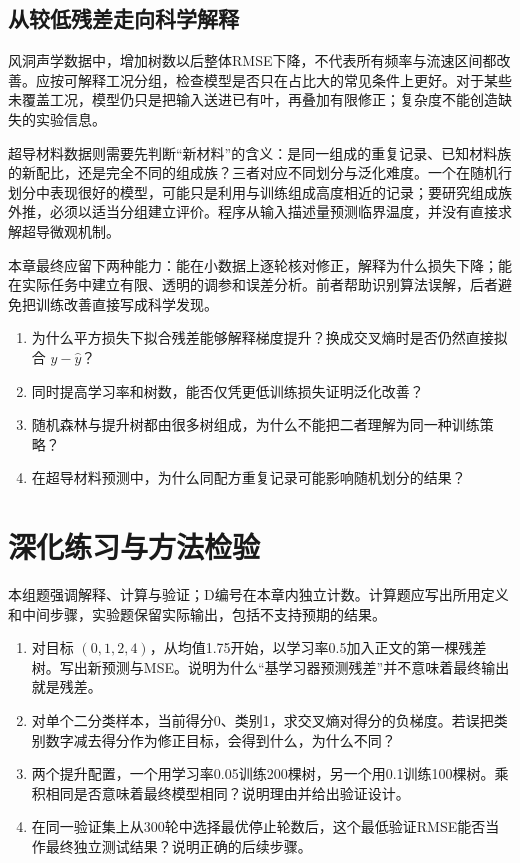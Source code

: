 \subsection{从较低残差走向科学解释}
风洞声学数据中，增加树数以后整体RMSE下降，不代表所有频率与流速区间都改善。应按可解释工况分组，检查模型是否只在占比大的常见条件上更好。对于某些未覆盖工况，模型仍只是把输入送进已有叶，再叠加有限修正；复杂度不能创造缺失的实验信息。

超导材料数据则需要先判断“新材料”的含义：是同一组成的重复记录、已知材料族的新配比，还是完全不同的组成族？三者对应不同划分与泛化难度。一个在随机行划分中表现很好的模型，可能只是利用与训练组成高度相近的记录；要研究组成族外推，必须以适当分组建立评价。程序从输入描述量预测临界温度，并没有直接求解超导微观机制。

本章最终应留下两种能力：能在小数据上逐轮核对修正，解释为什么损失下降；能在实际任务中建立有限、透明的调参和误差分析。前者帮助识别算法误解，后者避免把训练改善直接写成科学发现。

\chapterexercise
\begin{enumerate}
\item 为什么平方损失下拟合残差能够解释梯度提升？换成交叉熵时是否仍然直接拟合 $y-\hat y$？
\item 同时提高学习率和树数，能否仅凭更低训练损失证明泛化改善？
\item 随机森林与提升树都由很多树组成，为什么不能把二者理解为同一种训练策略？
\item 在超导材料预测中，为什么同配方重复记录可能影响随机划分的结果？
\end{enumerate}

\section*{深化练习与方法检验}
本组题强调解释、计算与验证；D编号在本章内独立计数。计算题应写出所用定义和中间步骤，实验题保留实际输出，包括不支持预期的结果。
\begin{enumerate}[label=D\arabic*.]
\item 对目标 $(0,1,2,4)$，从均值1.75开始，以学习率0.5加入正文的第一棵残差树。写出新预测与MSE。说明为什么“基学习器预测残差”并不意味着最终输出就是残差。
\item 对单个二分类样本，当前得分0、类别1，求交叉熵对得分的负梯度。若误把类别数字减去得分作为修正目标，会得到什么，为什么不同？
\item 两个提升配置，一个用学习率0.05训练200棵树，另一个用0.1训练100棵树。乘积相同是否意味着最终模型相同？说明理由并给出验证设计。
\item 在同一验证集上从300轮中选择最优停止轮数后，这个最低验证RMSE能否当作最终独立测试结果？说明正确的后续步骤。
\end{enumerate}
